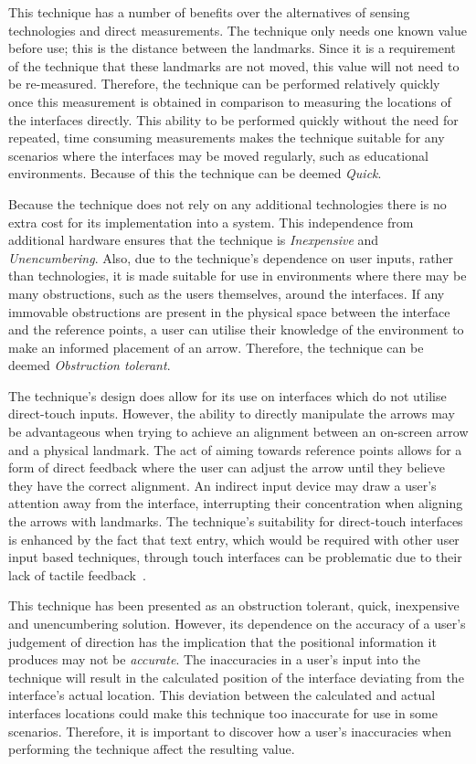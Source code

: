 \documentclass{bmcart}
\begin{document}
This technique has a number of benefits over the alternatives of sensing technologies and direct measurements.
The technique only needs one known value before use; this is the distance between the landmarks.
Since it is a requirement of the technique that these landmarks are not moved, this value will not need to be re-measured.
Therefore, the technique can be performed relatively quickly once this measurement is obtained in comparison to measuring the locations of the interfaces directly.
This ability to be performed quickly without the need for repeated, time consuming measurements makes the technique suitable for any scenarios where the interfaces may be moved regularly, such as educational environments.
Because of this the technique can be deemed {\emph{Quick}}.

Because the technique does not rely on any additional technologies there is no extra cost for its implementation into a system.
This independence from additional hardware ensures that the technique is {\emph{Inexpensive}} and {\emph{Unencumbering}}.
Also, due to the technique's dependence on user inputs, rather than technologies, it is made suitable for use in environments where there may be many obstructions, such as the users themselves, around the interfaces.
If any immovable obstructions are present in the physical space between the interface and the reference points, a user can utilise their knowledge of the environment to make an informed placement of an arrow.
Therefore, the technique can be deemed {\emph{Obstruction tolerant}}.

The technique's design does allow for its use on interfaces which do not utilise direct-touch inputs.
However, the ability to directly manipulate the arrows may be advantageous when trying to achieve an alignment between an on-screen arrow and a physical landmark. 
The act of aiming towards reference points allows for a form of direct feedback where the user can adjust the arrow until they believe they have the correct alignment.  
An indirect input device may draw a user's attention away from the interface, interrupting their concentration when aligning the arrows with landmarks.
The technique's suitability for direct-touch interfaces is enhanced by the fact that text entry, which would be required with other user input based techniques, through touch interfaces can be problematic due to their lack of tactile feedback~\cite{Weiss2009}.

This technique has been presented as an obstruction tolerant, quick, inexpensive and unencumbering solution.
However, its dependence on the accuracy of a user's judgement of direction has the implication that the positional information it produces may not be {\emph{accurate}}.
The inaccuracies in a user's input into the technique will result in the calculated position of the interface deviating from the interface's actual location.
This deviation between the calculated and actual interfaces locations could make this technique too inaccurate for use in some scenarios.
Therefore, it is important to discover how a user's inaccuracies when performing the technique affect the resulting value.
\end{document}
